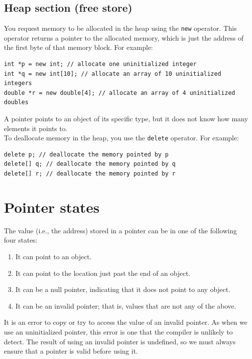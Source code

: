 \subsection{Heap section (free store)}

You request memory to be allocated in the heap using the \texttt{new} operator. This operator returns a pointer to the allocated memory,
which is just the address of the first byte of that memory block. For example:\\

\begin{lstlisting}
int *p = new int; // allocate one uninitialized integer
int *q = new int[10]; // allocate an array of 10 uninitialized integers
double *r = new double[4]; // allocate an array of 4 uninitialized doubles
\end{lstlisting}

A pointer points to an object of its specific type, but it does not know how many elements it points to.\\

To deallocate memory in the heap, you use the \texttt{delete} operator. For example:\\

\begin{lstlisting}
delete p; // deallocate the memory pointed by p
delete[] q; // deallocate the memory pointed by q
delete[] r; // deallocate the memory pointed by r
\end{lstlisting}

\section{Pointer states}

The value (i.e., the address) stored in a pointer can be in one of the following four states:

\begin{enumerate}
    \item It can point to an object.
    \item It can point to the location just past the end of an object.
    \item It can be a null pointer, indicating that it does not point to any object.
    \item It can be an invalid pointer; that is, values that are not any of the above.
\end{enumerate}

It is an error to copy or try to access the value of an invalid pointer. As when we use an uninitialized pointer,
this error is one that the compiler is unlikely to detect. The result of using an invalid pointer is undefined, so
we must always ensure that a pointer is valid before using it.\\

